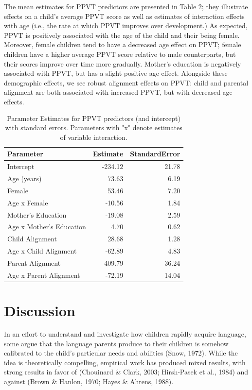 \documentclass[10pt, letterpaper]{article}
\begin{document}
The mean estimates for PPVT predictors are presented in Table 2; they
illustrate effects on a child's average PPVT score as well as estimates
of interaction effects with age (i.e., the rate at which PPVT improves
over development.) As expected, PPVT is positively associated with the
age of the child and their being female. Moreover, female children tend
to have a decreased age effect on PPVT; female children have a higher
average PPVT score relative to male counterparts, but their scores
improve over time more gradually. Mother's education is negatively
associated with PPVT, but has a slight positive age effect. Alongside
these demographic effects, we see robust alignment effects on PPVT:
child and parental alignment are both associated with increased PPVT,
but with decreased age effects.

\begin{table}[H]
\centering
\begin{tabular}{lrr}
  \hline
Parameter & Estimate & StandardError \\ 
  \hline
Intercept & -234.12 & 21.78 \\ 
  Age (years) & 73.63 & 6.19 \\ 
  Female & 53.46 & 7.20 \\ 
  Age x Female & -10.56 & 1.84 \\ 
  Mother's Education & -19.08 & 2.59 \\ 
  Age x Mother's Education & 4.70 & 0.62 \\ 
  Child Alignment & 28.68 & 1.28 \\ 
  Age x Child Alignment & -62.89 & 4.83 \\ 
  Parent Alignment & 409.79 & 36.24 \\ 
  Age x Parent Alignment & -72.19 & 14.04 \\ 
   \hline
\end{tabular}
\caption{Parameter Estimates for PPVT predictors (and intercept) with standard errors. Parameters with "x" denote estimates of variable interaction.} 
\end{table}

\hypertarget{discussion}{%
\section{Discussion}\label{discussion}}

In an effort to understand and investigate how children rapidly acquire
language, some argue that the language parents produce to their children
is somehow calibrated to the child's particular needs and abilities
(Snow, 1972). While the idea is theoretically compelling, empirical work
has produced mixed results, with strong results in favor of (Chouinard
\& Clark, 2003; Hirsh-Pasek et al., 1984) and against (Brown \& Hanlon,
1970; Hayes \& Ahrens, 1988).
\end{document}
